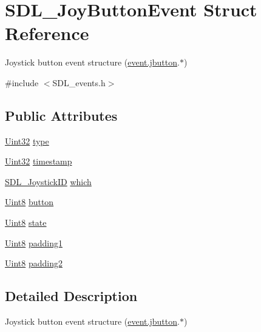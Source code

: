 \hypertarget{struct_s_d_l___joy_button_event}{\section{S\-D\-L\-\_\-\-Joy\-Button\-Event Struct Reference}
\label{struct_s_d_l___joy_button_event}
}


Joystick button event structure (\hyperlink{union_s_d_l___event_a591104d64903ae1cf70874fb5d3124ff}{event.\-jbutton}.$\ast$)  




{\ttfamily \#include $<$S\-D\-L\-\_\-events.\-h$>$}

\subsection*{Public Attributes}
\begin{DoxyCompactItemize}
\item 
\hyperlink{_s_d_l__stdinc_8h_add440eff171ea5f55cb00c4a9ab8672d}{Uint32} \hyperlink{struct_s_d_l___joy_button_event_a8f3312a046d37fa2884b93f69c4cb655}{type}
\item 
\hyperlink{_s_d_l__stdinc_8h_add440eff171ea5f55cb00c4a9ab8672d}{Uint32} \hyperlink{struct_s_d_l___joy_button_event_ab50b6f7d1ab3ac53df69fc2d6cf5fa2a}{timestamp}
\item 
\hyperlink{_s_d_l__joystick_8h_a3c3d32500cb08f76ee8077983912c0bd}{S\-D\-L\-\_\-\-Joystick\-I\-D} \hyperlink{struct_s_d_l___joy_button_event_a1679049adad7242b28420948fdc79044}{which}
\item 
\hyperlink{_s_d_l__stdinc_8h_a2944638813a090aa23e62f4da842c3e2}{Uint8} \hyperlink{struct_s_d_l___joy_button_event_a73ebe4261cf80564052af9c1af737a4d}{button}
\item 
\hyperlink{_s_d_l__stdinc_8h_a2944638813a090aa23e62f4da842c3e2}{Uint8} \hyperlink{struct_s_d_l___joy_button_event_ad3b6f8d9aa2c5e694f664b97d12bcd2b}{state}
\item 
\hyperlink{_s_d_l__stdinc_8h_a2944638813a090aa23e62f4da842c3e2}{Uint8} \hyperlink{struct_s_d_l___joy_button_event_a3e7ca473fb7783d755d64598529b1ff9}{padding1}
\item 
\hyperlink{_s_d_l__stdinc_8h_a2944638813a090aa23e62f4da842c3e2}{Uint8} \hyperlink{struct_s_d_l___joy_button_event_a77a78bee38f4bf0682ccd97bbf8f9ab9}{padding2}
\end{DoxyCompactItemize}


\subsection{Detailed Description}
Joystick button event structure (\hyperlink{union_s_d_l___event_a591104d64903ae1cf70874fb5d3124ff}{event.\-jbutton}.$\ast$) 

